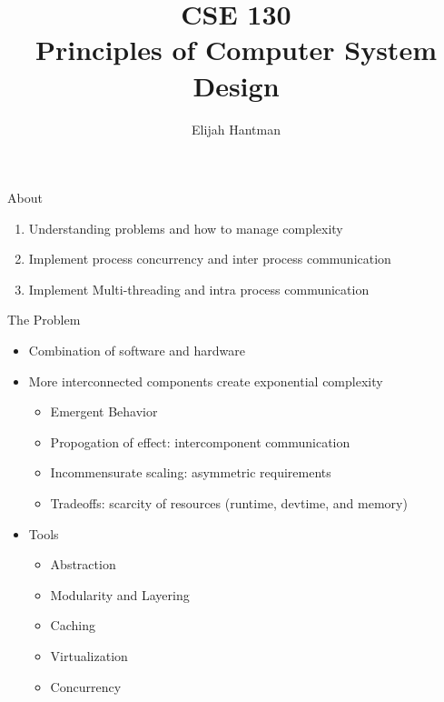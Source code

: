 \documentclass{report}
\title{\Huge{CSE 130}\\\huge{Principles of Computer System Design}}
\author{\huge{Elijah Hantman}}
\date{}
\begin{document}
\maketitle
\newpage

\begin{description}
    \item About 
        \begin{mdframed}
            \begin{enumerate}
                \item Understanding problems and how to manage
                    complexity
                \item Implement process concurrency and inter
                    process communication
                \item Implement Multi-threading and intra
                    process communication
            \end{enumerate}
        \end{mdframed}
    \item The Problem
        \begin{itemize}
            \item Combination of software and hardware
            \item More interconnected components create exponential
                complexity
                \begin{itemize}
                    \item Emergent Behavior
                    \item Propogation of effect: intercomponent communication
                    \item Incommensurate scaling: asymmetric requirements
                    \item Tradeoffs: scarcity of resources (runtime, devtime, and memory)
                \end{itemize}
            \item Tools
                \begin{itemize}
                    \item Abstraction
                    \item Modularity and Layering
                    \item Caching
                    \item Virtualization
                    \item Concurrency
                \end{itemize}
        \end{itemize}

\end{description}
\end{document}
